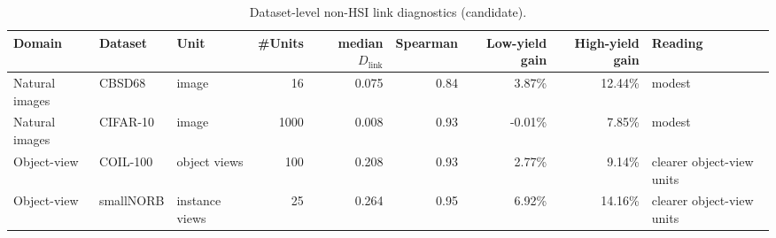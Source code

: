 
\begin{table}[t]
\centering
\caption{Dataset-level non-HSI link diagnostics (candidate).}
\begin{tabular}{@{}l l l r r r r r l@{}}
\toprule
Domain & Dataset & Unit & \#Units & median $D_{\mathrm{link}}$ & Spearman & Low-yield gain & High-yield gain & Reading \\
\midrule
Natural images & CBSD68 & image & 16 & 0.075 & 0.84 & 3.87\% & 12.44\% & modest \\
Natural images & CIFAR-10 & image & 1000 & 0.008 & 0.93 & -0.01\% & 7.85\% & modest \\
Object-view & COIL-100 & object views & 100 & 0.208 & 0.93 & 2.77\% & 9.14\% & clearer object-view units \\
Object-view & smallNORB & instance views & 25 & 0.264 & 0.95 & 6.92\% & 14.16\% & clearer object-view units \\
\bottomrule
\end{tabular}
\end{table}

